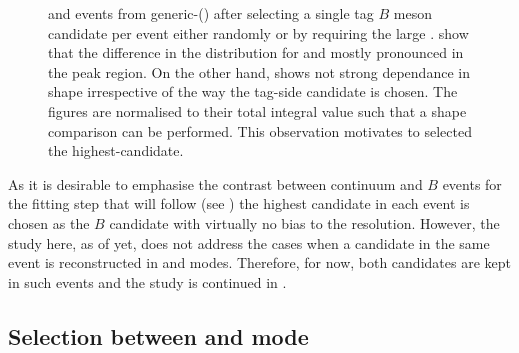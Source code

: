 \begin{figure}[htbp!]
{    and \mbox{\epem\ra\qqbar} events from generic-\MC () after selecting a single tag $B$ meson candidate per event either randomly or by requiring the large \feiProb.
     show that the difference in the \Mbc distribution for \BptoXsgamma and \BztoXsgamma mostly pronounced in the peak region.
    On the other hand,  shows not strong dependance in shape irrespective of the way the tag-side candidate is chosen.
    The figures are normalised to their total integral value such that a shape comparison can be performed.
    This observation motivates to selected the highest-\feiProb candidate.
    }    
\end{figure}

As it is desirable to emphasise the contrast between continuum and $B$ events for the fitting step that will follow (see )
the highest \feiProb candidate in each event is chosen as the $B$ candidate with virtually no bias to the resolution.
However, the study here, as of yet, does not address the cases when a candidate in the same event is reconstructed in \feiBp and \feiBz modes.
Therefore, for now, both candidates are kept in such events and the study is continued in .

\subsection{Selection between \texorpdfstring{\feiBp}{feiB+} and \texorpdfstring{\feiBz}{feiB0} mode}\label{sec:select_best_candidate}

